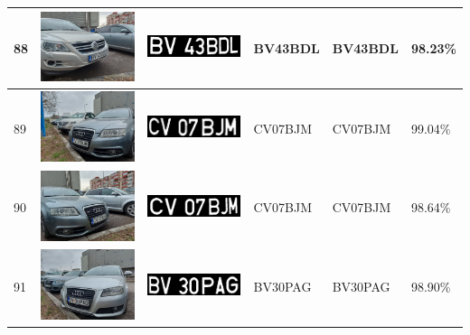 \documentclass[a4paper,12pt]{report}
\begin{document}
\begin{longtable}{| m{0.6cm} | m{3cm} | m{3cm} | m{1.8cm} | m{1.8cm} | m{1.8cm} |}
    88  & \includegraphics[width=3cm,keepaspectratio]{dataset/52_s1.jpg}  & \includegraphics[width=3cm,keepaspectratio]{segmentari/88.jpg}  & BV43BDL             & BV43BDL              & 98.23\%    \\ \hline
    89  & \includegraphics[width=3cm,keepaspectratio]{dataset/53_d1.jpg}  & \includegraphics[width=3cm,keepaspectratio]{segmentari/89.jpg}  & CV07BJM             & CV07BJM              & 99.04\%    \\ \hline
    90  & \includegraphics[width=3cm,keepaspectratio]{dataset/53_s1.jpg}  & \includegraphics[width=3cm,keepaspectratio]{segmentari/90.jpg}  & CV07BJM             & CV07BJM              & 98.64\%    \\ \hline
    91  & \includegraphics[width=3cm,keepaspectratio]{dataset/54_d1.jpg}  & \includegraphics[width=3cm,keepaspectratio]{segmentari/91.jpg}  & BV30PAG             & BV30PAG              & 98.90\%    \\ \hline

\end{longtable}
\end{document}
